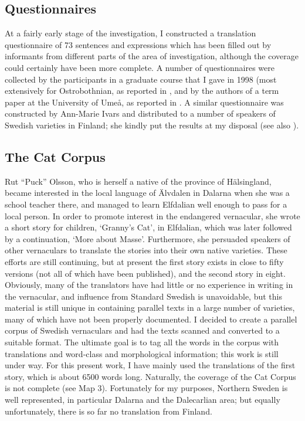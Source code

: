 
\subsection{Questionnaires}
At a fairly early stage of the investigation, I constructed a translation questionnaire of 73 sentences and expressions which has been filled out by informants from different parts of the area of investigation, although the coverage could certainly have been more complete. A number of questionnaires were collected by the participants in a graduate course that I gave in 1998 (most extensively for Ostrobothnian, as reported in \citet[II:147]{ErikssonEtAl1999}, and by the authors of a term paper at the University of Umeå, as reported in \citet{BergholmEtAl1999}. A similar questionnaire was constructed by Ann-Marie Ivars and distributed to a number of speakers of Swedish varieties in Finland; she kindly put the results at my disposal (see also \citet{Ivars2005}).


\subsection{The Cat Corpus}
Rut “Puck” Olsson, who is herself a native of the province of Hälsingland, became interested in the local language of Älvdalen in Dalarna when she was a school teacher there, and managed to learn Elfdalian well enough to pass for a local person. In order to promote interest in the endangered vernacular, she wrote a short story for children,  ‘Granny’s Cat’, in Elfdalian, which was later followed by a continuation,  ‘More about Masse’. Furthermore, she persuaded speakers of other vernaculars to translate the stories into their own native varieties. These efforts are still continuing, but at present the first story exists in close to fifty versions (not all of which have been published), and the second story in eight. Obviously, many of the translators have had little or no experience in writing in the vernacular, and influence from Standard Swedish is unavoidable, but this material is still unique in containing parallel texts in a large number of varieties, many of which have not been properly documented. I decided to create a parallel corpus of Swedish vernaculars and had the texts scanned and converted to a suitable format. The ultimate goal is to tag all the words in the corpus with translations and word-class and morphological information; this work is still under way. For this present work, I have mainly used the translations of the first story, which is about 6500 words long. Naturally, the coverage of the Cat Corpus is not complete (see Map 3). Fortunately for my purposes, Northern Sweden is well represented, in particular Dalarna and the Dalecarlian area; but equally unfortunately, there is so far no translation from Finland. 

